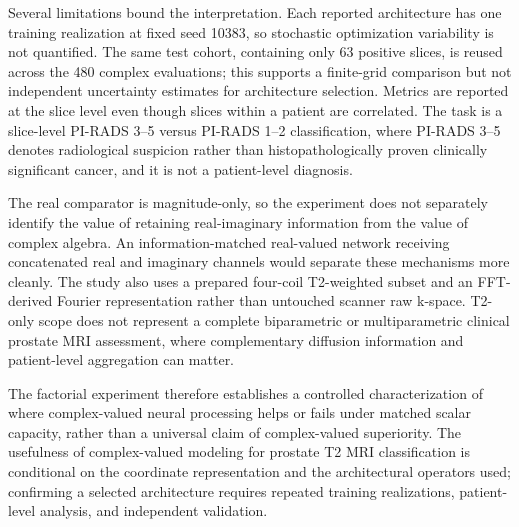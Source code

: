 Several limitations bound the interpretation. Each reported architecture has one training realization at fixed seed 10383, so stochastic optimization variability is not quantified. The same test cohort, containing only 63 positive slices, is reused across the 480 complex evaluations; this supports a finite-grid comparison but not independent uncertainty estimates for architecture selection. Metrics are reported at the slice level even though slices within a patient are correlated. The task is a slice-level PI-RADS 3--5 versus PI-RADS 1--2 classification, where PI-RADS 3--5 denotes radiological suspicion rather than histopathologically proven clinically significant cancer, and it is not a patient-level diagnosis.

The real comparator is magnitude-only, so the experiment does not separately identify the value of retaining real-imaginary information from the value of complex algebra. An information-matched real-valued network receiving concatenated real and imaginary channels would separate these mechanisms more cleanly. The study also uses a prepared four-coil T2-weighted subset and an FFT-derived Fourier representation rather than untouched scanner raw k-space. T2-only scope does not represent a complete biparametric or multiparametric clinical prostate MRI assessment, where complementary diffusion information and patient-level aggregation can matter.

The factorial experiment therefore establishes a controlled characterization of where complex-valued neural processing helps or fails under matched scalar capacity, rather than a universal claim of complex-valued superiority. The usefulness of complex-valued modeling for prostate T2 MRI classification is conditional on the coordinate representation and the architectural operators used; confirming a selected architecture requires repeated training realizations, patient-level analysis, and independent validation.
